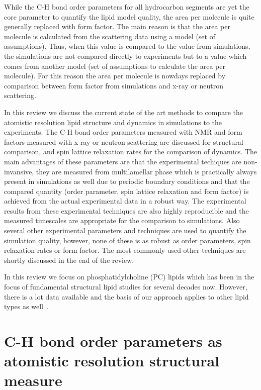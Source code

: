 \documentclass[aps,prl,superscriptaddress,twocolumn]{revtex4}
\begin{document}
While the C-H bond order parameters for all hydrocarbon segments are yet the
core parameter to quantify the lipid model quality, the area per molecule 
is quite generally replaced with form factor.
The main reason is that the area per molecule is calculated from the scattering
data using a model (set of assumptions). Thus, when this value is compared to
the value from simulations, the simulations are not compared directly to experiments
but to a value which comes from another model (set of assumptions to calculate the
area per molecule). For this reason the area per molecule is nowdays replaced
by comparison between form factor from simulations and x-ray or neutron scattering.

In this review we discuss the current state of the art methods to compare the 
atomistic resolution lipid structure and dynamics in simulations to the experiments. 
The C-H bond order parameters measured with NMR and form factors measured
with x-ray or neutron scattering are discussed for structural comparison,
and spin lattice relaxation rates for the comparison of dynamics.
The main advantages of these parameters are that
the experimental techiques are non-invansive, they are measured from multilamellar phase 
which is practically always present in simulations as well due to periodic boundary conditions
and that the compared quantity (order parameter, spin lattice relaxation and form factor) is achieved from 
the actual experimental data in a robust way. The experimental results from these
experimental techniques are also highly reproducible and the measured timescales
are appropriate for the comparison to simulations. Also several other experimental
parameters and techniques are used to quantify the simulation quality, however,
none of these is as robust as order parameters, spin relaxation rates or form factor. The most
commonly used other techniques are shortly discussed in the end of the review.

In this review we focus on phosphatidylcholine (PC) lipids which has been
in the focus of fundamental structural lipid studies for several decades now. However, there is a lot
data available and the basis of our approach applies to other lipid types as well~\cite{??}.

\section{C-H bond order parameters as atomistic resolution structural measure}

\end{document}
